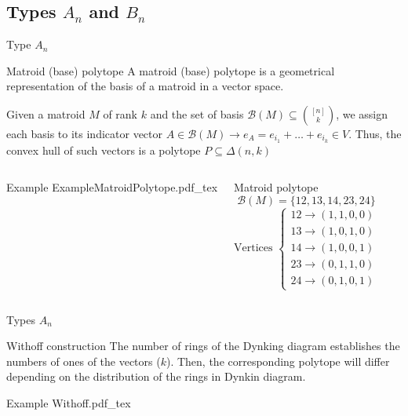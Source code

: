 \documentclass{beamer}
\newcommand{\incfig}[1]{%
\center
\def\svgwidth{0.9\columnwidth}
{#1.pdf_tex}
}
\begin{document}
\subsection{Types $A_n$ and $B_n$}
\begin{frame}{Type $A_n$}
\begin{block}{Matroid (base) polytope}
A matroid (base) polytope is a geometrical representation of the basis of a matroid in a vector space. 

Given a matroid $M$ of rank $k$ and the set of basis $\mathcal{B}(M)\subseteq \binom{[n]}{k}$, we assign each basis to its indicator vector $A\in \mathcal{B}(M) \to e_A = e_{i_1} + \ldots + e_{i_k}\in V$. Thus, the convex hull of such vectors is a polytope $P\subseteq \Delta(n,k)$ 
\end{block}  
\begin{columns}[c]
\vspace{-1em}
\begin{block}{Example}
\incfig{ExampleMatroidPolytope}
\end{block}
\vspace{-1em}
\begin{block}{Matroid polytope}
  \[
  \mathcal{B}(M) = \{12, 13, 14, 23, 24\}
  \] 
  \vspace{-1em}
  \[
  \text{Vertices } \begin{cases}
    12 \to (1, 1, 0, 0)\\
	13 \to (1, 0, 1, 0)\\
	14 \to (1, 0, 0, 1)\\
	23 \to (0, 1, 1, 0)\\
	24 \to  (0, 1, 0, 1)
  \end{cases}
  \] 
\end{block}
\end{columns}
\end{frame}



\begin{frame}{Types $A_n$}
  \begin{block}{Withoff construction}
  The number of rings of the Dynking diagram establishes the numbers of ones of the vectors ($k$). Then, the corresponding polytope will differ depending on the distribution of the rings in Dynkin diagram.
  \end{block}
  \begin{block}{Example}
   \incfig{Withoff} 
  \end{block}
\end{frame}
\end{document}
